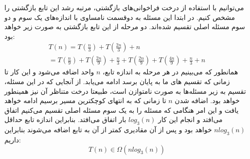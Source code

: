 \documentclass[]{article}
\begin{document}
می‌توانیم با استفاده از درخت فراخوانی‌های بازگشتی، مرتبه رشد این تابع بازگشتی را مشخص کنیم.
در ابتدا این مسئله به دوقسمت نامساوی با اندازه‌های یک سوم و دو سوم مسئله اصلی تقسیم شده‌اند.
دو مرحله از این تابع بازگشتی به صورت زیر خواهد بود:
\begin{align}
T(n) = T(\frac{n}{3}) + T(\frac{2n}{3}) + n \\
= T(\frac{n}{9}) + T(\frac{2n}{9}) + \frac{n}{3} + T(\frac{2n}{9}) + T(\frac{4n}{9}) + \frac{n}{3} + n
\end{align}
همانطور که می‌بینیم در هر مرحله به اندازه تابع، $n$ واحد اضافه می‌شود
و این کار تا زمانی که تقسیم های ما به پایان برسد ادامه می‌یابد.
از آنجایی که در این مسئله، تقسیم به زیر مسئله‌ها به صورت نامتوازن است، طبیعتا درخت متناظر آن نیز همینطور خواهد بود.
اضافه شدن $n$ تا زمانی که به انتهای کوچکترین مسیر برسیم ادامه خواهد یافت
و این امر هنگامی که مسئله را به یک سوم مسئله اصلی تقسیم می‌کنیم اتفاق می‌افتد
و انجام این کار $log_3(n)$ بار اتفاق می‌افتد.
بنابراین اندازه تابع حداقل $n log_3(n)$ خواهد بود و پس از آن
مقادیری کمتر از آن به تابع اضافه می‌شوند بنابراین داریم:
$$T(n) \in \Omega(nlog_3(n))$$
\end{document}
